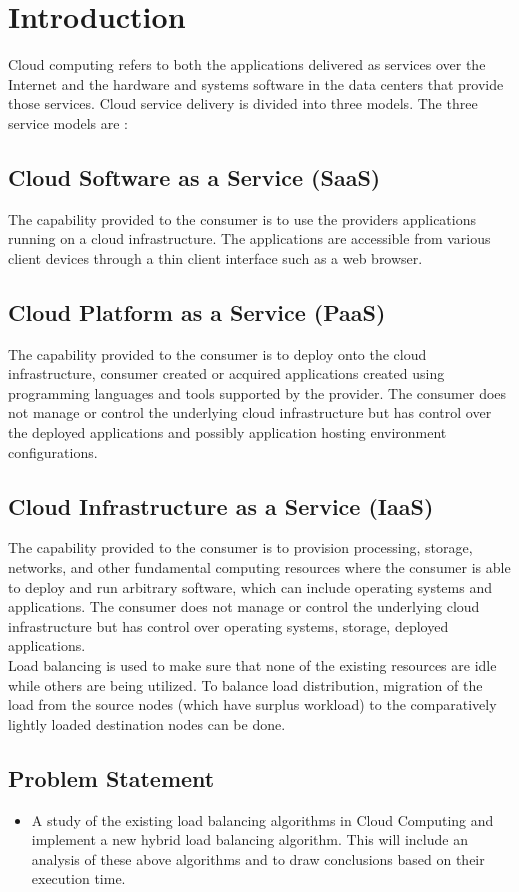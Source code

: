 \chapter{Introduction}
Cloud computing refers to both the applications delivered as services over the Internet and the hardware and systems software in the data centers that provide those services. Cloud service delivery is divided into three models. The three service models are \cite {Ratan} :

\section{Cloud Software as a Service (SaaS)}
The capability provided to the consumer is to use the providers applications running on a cloud
infrastructure. The applications are accessible from various client devices through a thin client
interface such as a web browser. 

\section{Cloud Platform as a Service (PaaS)}
The capability provided to the consumer is to deploy onto the cloud infrastructure, consumer
created or acquired applications created using programming languages and tools supported by the
provider. The consumer does not manage or control the underlying cloud infrastructure but has
control over the deployed applications and possibly application hosting environment
configurations.

\section{Cloud Infrastructure as a Service (IaaS)}
The capability provided to the consumer is to provision processing, storage, networks, and other
fundamental computing resources where the consumer is able to deploy and run arbitrary
software, which can include operating systems and applications. The consumer does not manage
or control the underlying cloud infrastructure but has control over operating systems, storage,
deployed applications.\\[0.2cm]
Load balancing is used to make sure that none of the existing resources are idle while others are being utilized. To balance load distribution, migration of the load from the source nodes (which have surplus workload) to the comparatively lightly loaded destination nodes can be done.

\section{Problem Statement}
\begin{itemize}
\item A study of the existing load balancing algorithms in Cloud Computing and
implement a new hybrid load balancing algorithm. This will include an 
analysis of these above algorithms and to draw conclusions based on 
their execution time. 
\end{itemize}

